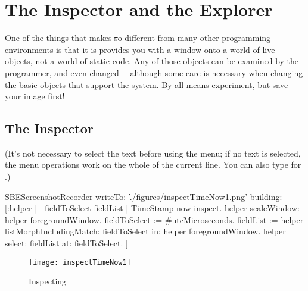 \documentclass[a4paper,10pt,twoside]{book}
\begin{document}
\section{The Inspector and the Explorer}
\label{sec:inspector} %

One of the things that makes \st so different from many other programming environments is that it is provides you with a window onto a world of live objects, not a world of static code.
Any of those objects can be examined by the programmer, and even changed\,---\,although some care is necessary when changing the basic objects that support the system.  
By all means experiment, but save your image first!

\subsection{The Inspector}

(It's not necessary to select the text before using the menu; if no text is selected, the menu operations work on the whole of the current line.
You can also type  for .)

\begin{ExecuteSmalltalkScript}
SBEScreenshotRecorder writeTo: './figures/inspectTimeNow1.png' building: [:helper |
	| fieldToSelect fieldList |
	TimeStamp now inspect.
	helper scaleWindow: helper foregroundWindow.
	fieldToSelect := #utcMicroseconds.
	fieldList := helper listMorphIncludingMatch: fieldToSelect in: helper foregroundWindow.
	helper select: fieldList at: fieldToSelect.
]
\end{ExecuteSmalltalkScript}
\begin{figure}[btp]
	\begin{center}
		\texttt{[image: inspectTimeNow1]}
	\end{center}
	\caption{Inspecting }
	\label{fig:inspectTimeNow1}
\end{figure}
\end{document}
